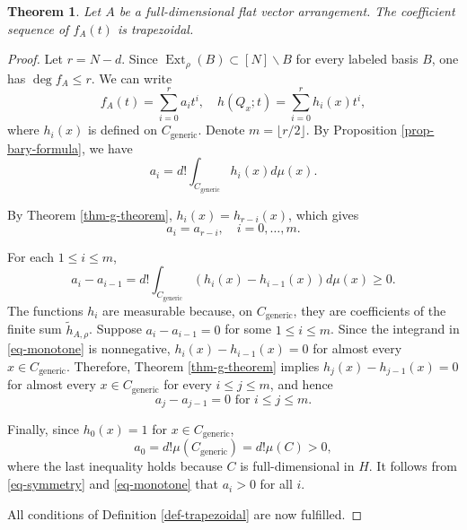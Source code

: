 \documentclass[12pt]{amsart}
\newtheorem{theorem}{Theorem}
\numberwithin{equation}{section}
\numberwithin{theorem}{section}
\newcommand{\op}{\operatorname}
\begin{document}
\begin{theorem}
  \label{thm-main}
  Let $A$ be a full-dimensional flat vector arrangement. The coefficient sequence of $f_A(t)$ is trapezoidal.
\end{theorem}
\begin{proof}
  Let $r=N-d$.
  Since $\op{Ext}_\rho(B)\subset[N]\backslash B$ for every labeled basis $B$, one has $\deg f_A\leq r$.
  We can write
  \begin{equation*}
    f_A(t)=\sum_{i=0}^{r}a_i t^i,\quad h(Q_x;t)=\sum_{i=0}^r h_i(x)t^i,
  \end{equation*}
  where $h_i(x)$ is defined on $C_{\mathrm{generic}}$. Denote $m=\lfloor r/2\rfloor$.
  By Proposition \ref{prop-bary-formula}, we have
  \begin{equation*}
    a_i=d!\int_{C_{\mathrm{generic}}} h_i(x)d\mu(x).
  \end{equation*}
  
  By Theorem \ref{thm-g-theorem}, $h_i(x)=h_{r-i}(x)$, which gives
  \begin{equation}
    \label{eq-symmetry}
    a_i=a_{r-i},\quad i=0,\dots,m.
  \end{equation}
  
  For each $1\leq i\leq m$, 
  \begin{equation}
    \label{eq-monotone}
    a_i-a_{i-1}=d! \int_{C_{\mathrm{generic}}} (h_i(x)-h_{i-1}(x))d\mu(x)\geq0.
  \end{equation}
  The functions $h_i$ are measurable because, on $C_{\mathrm{generic}}$, they are coefficients of the finite sum $\tilde h_{A,\rho}$. Suppose $a_i-a_{i-1}=0$ for some $1\leq i\leq m$. Since the integrand in \eqref{eq-monotone} is nonnegative, $h_i(x)-h_{i-1}(x)=0$ for almost every $x\in C_{\mathrm{generic}}$.
  Therefore, Theorem \ref{thm-g-theorem} implies $h_j(x)-h_{j-1}(x)=0$ for almost every $x\in C_{\mathrm{generic}}$ for every $i\leq j\leq m$, and hence
  \begin{equation}
    \label{eq-plateau}
    a_j-a_{j-1}=0\text{  for  }i\leq j\leq m.
  \end{equation} 
  
  Finally, since $h_0(x)=1$ for $x\in C_{\mathrm{generic}}$,
  \begin{equation}
    \label{eq-positive}
    a_0=d! \mu(C_{\mathrm{generic}})=d! \mu(C)>0,
  \end{equation}
  where the last inequality holds because $C$ is full-dimensional in $H$. It follows from \eqref{eq-symmetry} and \eqref{eq-monotone} that $a_i>0$ for all $i$.
  
  All conditions of Definition \ref{def-trapezoidal} are now fulfilled. 
\end{proof}
\end{document}
